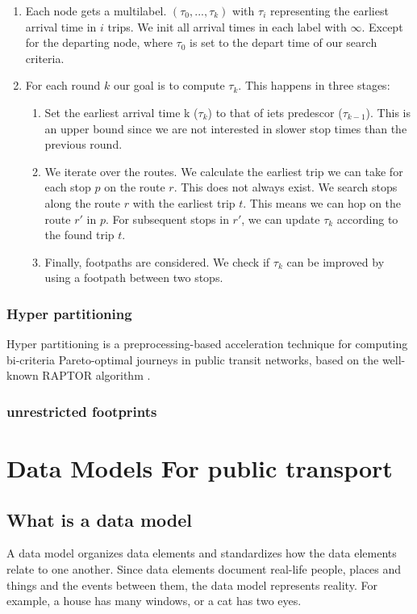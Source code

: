 \begin{enumerate}
    \item Each node gets a multilabel. $(\tau_0,...,\tau_k)$ with $\tau_i$ representing the earliest arrival time in $i$ trips. We init all arrival times in each label with $\infty$. Except for the departing node, where $\tau_0$ is set to the depart time of our search criteria.
    \item For each round $k$ our goal is to compute $\tau_k$. This happens in three stages:\begin{enumerate}
        \item Set the earliest arrival time k ($\tau_k$) to that of iets predescor ($\tau_{k-1}$). This is an upper bound since we are not interested in slower stop times than the previous round.
        \item We iterate over the routes. We calculate the earliest trip we can take for each stop $p$ on the route $r$. This does not always exist. We search stops along the route $r$ with the earliest trip $t$. This means we can hop on the route $r'$ in $p$. For subsequent stops in $r'$, we can update $\tau_k$ according to the found trip $t$.
        \item Finally, footpaths are considered. We check if $\tau_k$ can be improved by using a footpath between two stops. 
    \end{enumerate}
\end{enumerate}

\subsubsection{Hyper partitioning}
Hyper partitioning is a preprocessing-based acceleration technique for computing bi-criteria Pareto-optimal journeys in public transit networks, based on the well-known RAPTOR algorithm \cite{delling_round-based_2015}.
\subsubsection{unrestricted footprints}
\section{Data Models For public transport}\label{section:data_model_rel_work}
\subsection{What is a data model }
A data model organizes data elements and standardizes how the data elements relate to one another. Since data elements document real-life people, places and things and the events between them, the data model represents reality. For example, a house has many windows, or a cat has two eyes.

